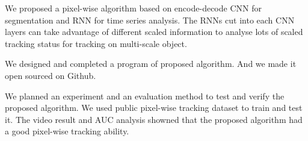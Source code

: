 \begin{eabstract}
	\par
	We proposed a pixel-wise algorithm based on encode-decode CNN for segmentation and RNN for time series analysis. The RNNs cut into each CNN layers can take advantage of different scaled information to analyse lots of scaled tracking status for tracking on multi-scale object.
	\par
	We designed and completed a program of proposed algorithm. And we made it open sourced on Github.
	\par
	We planned an experiment and an evaluation method to test and verify the proposed algorithm. We used public pixel-wise tracking dataset to train and test it. The video result and AUC analysis showned that the proposed algorithm had a good pixel-wise tracking ability.
\end{eabstract}

